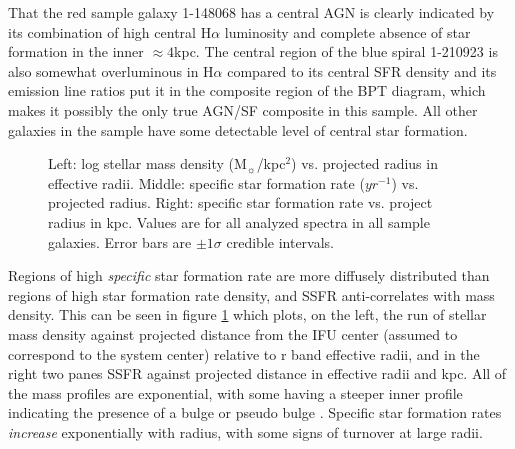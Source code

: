 \documentclass[modern]{aastex62}
\begin{document}
That the red sample galaxy 1-148068 has a central AGN is clearly indicated by its combination of high central H$\alpha$ luminosity and complete absence of star formation in the inner $\approx 4$kpc. The central region of the blue spiral 1-210923 is also somewhat overluminous in H$\alpha$ compared to its central SFR density and its emission line ratios put it in the composite region of the BPT diagram, which makes it possibly the only true AGN/SF composite in this sample. All other galaxies in the sample have some detectable level of central star formation.

\begin{figure}[ht]
\caption{Left: log stellar mass density (M$_\sun$/kpc$^2$) vs. projected radius in effective radii. Middle: specific star formation rate ($yr^{-1}$) vs. projected radius. Right: specific star formation rate vs. project radius in kpc. Values are for all analyzed spectra in all sample galaxies. Error bars are $\pm 1 \sigma$ credible intervals.}
\label{fig:mstarssfr}
\end{figure}

Regions of high \emph{specific} star formation rate are more diffusely distributed than regions of high star formation rate density, and SSFR anti-correlates with mass density. This can be seen in figure \ref{fig:mstarssfr} which plots, on the left, the run of stellar mass density against projected distance from the IFU center (assumed to correspond to the system center) relative to r band effective radii, and in the right two panes SSFR against projected distance in effective radii and kpc. All of the mass profiles are exponential, with some having a steeper inner profile indicating the presence of a bulge or pseudo bulge \citep{1970ApJ...160..811F, 2006A&A...454..759P, 2008ApJ...683L.103B}. Specific star formation rates \emph{increase} exponentially with radius, with some signs of turnover at large radii. 
\end{document}
